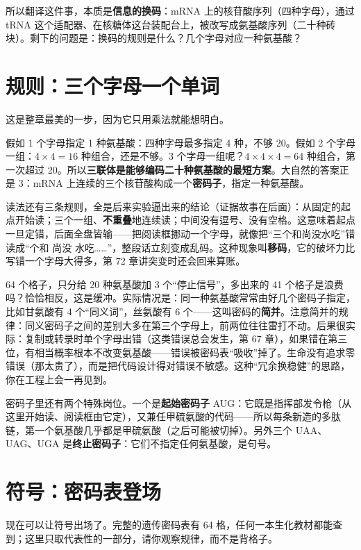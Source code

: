 所以翻译这件事，本质是\textbf{信息的换码}：mRNA 上的核苷酸序列（四种字母），通过 tRNA 这个适配器、在核糖体这台装配台上，被改写成氨基酸序列（二十种砖块）。剩下的问题是：换码的规则是什么？几个字母对应一种氨基酸？

\section{规则：三个字母一个单词}

这是整章最美的一步，因为它只用乘法就能想明白。

假如 1 个字母指定 1 种氨基酸：四种字母最多指定 4 种，不够 20。假如 2 个字母一组：$4\times 4=16$ 种组合，还是不够。3 个字母一组呢？$4\times 4\times 4=64$ 种组合，第一次超过 20。所以\textbf{三联体是能够编码二十种氨基酸的最短方案}。大自然的答案正是 3：mRNA 上连续的三个核苷酸构成一个\textbf{密码子}，指定一种氨基酸。

读法还有三条规则，全是后来实验逼出来的结论（证据故事在后面）：从固定的起点开始读；三个一组、\textbf{不重叠}地连续读；中间没有逗号、没有空格。这意味着起点一旦定错，后面全盘皆输——把阅读框挪动一个字母，就像把“三个和尚没水吃”错读成“个和 尚没 水吃……”，整段话立刻变成乱码。这种现象叫\textbf{移码}，它的破坏力比写错一个字母大得多，第 72 章讲突变时还会回来算账。

\begin{qiaoliang}
64 个格子，只分给 20 种氨基酸加 3 个“停止信号”，多出来的 41 个格子是浪费吗？恰恰相反，这是缓冲。实际情况是：同一种氨基酸常常由好几个密码子指定，比如甘氨酸有 4 个“同义词”，丝氨酸有 6 个——这叫密码的\textbf{简并}。注意简并的规律：同义密码子之间的差别大多在第三个字母上，前两位往往雷打不动。后果很实际：复制或转录时单个字母出错（这类错误总会发生，第 67 章），如果错在第三位，有相当概率根本不改变氨基酸——错误被密码表“吸收”掉了。生命没有追求零错误（那太贵了），而是把代码设计得对错误不敏感。这种“冗余换稳健”的思路，你在工程上会一再见到。
\end{qiaoliang}

密码子里还有两个特殊岗位。一个是\textbf{起始密码子} AUG：它既是指挥部发令枪（从这里开始读、阅读框由它定），又兼任甲硫氨酸的代码——所以每条新造的多肽链，第一个氨基酸几乎都是甲硫氨酸（之后可能被切掉）。另外三个 UAA、UAG、UGA 是\textbf{终止密码子}：它们不指定任何氨基酸，是句号。

\section{符号：密码表登场}

现在可以让符号出场了。完整的遗传密码表有 64 格，任何一本生化教材都能查到；这里只取代表性的一部分，请你观察规律，而不是背格子。

